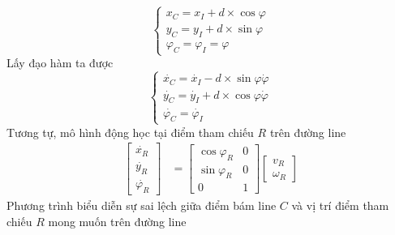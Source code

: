          \begin{equation}
               \begin{cases}
                    x_C = x_I + d \times \cos \varphi \\[0.5em]
                    y_C = y_I + d \times \sin \varphi \\[0.5em]
                    \varphi_C = \varphi_I = \varphi
               \end{cases}   
               \label{c5_e2}            
          \end{equation}
          \hspace*{0.6cm}Lấy đạo hàm ta được 
          \begin{equation}
               \begin{cases}
                    \dot{x_C} = \dot{x_I} - d \times \sin \varphi \dot{\varphi} \\[0.5em]
                    \dot{y_C} = \dot{y_I} + d \times \cos \varphi \dot{\varphi} \\[0.5em]
                    \dot{\varphi_C} = \dot{\varphi_I}
               \end{cases}
               \label{c5_e3}            
          \end{equation}
          \hspace*{0.6cm}Tương tự, mô hình động học tại điểm tham chiếu $R$ trên đường line
          \begin{align}
               \begin{bmatrix}
                    \dot{x_R} \\
                    \dot{y_R} \\
                    \dot{\varphi_R}
                    \end{bmatrix} &= \begin{bmatrix}
                    \cos\varphi_R & 0 \\
                    \sin\varphi_R & 0 \\
                    0 & 1
                    \end{bmatrix} \begin{bmatrix}
                    v_R \\
                    \omega_R
               \end{bmatrix}
               \label{c5_e4}
          \end{align}
          \hspace*{0.6cm}Phương trình biểu diễn sự sai lệch giữa điểm bám line $C$ và vị trí điểm tham chiếu $R$ mong muốn trên đường line
